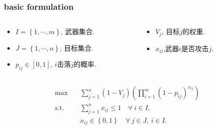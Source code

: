 \documentclass[CJK,10pt]{beamer}
\begin{document}
\begin{frame}
    \frametitle{basic formulation}
    \begin{columns}
        \begin{column}{.70\linewidth}
            \footnotesize
            \begin{itemize}
                \item $I = \left\{1,\cdots,m\right\} $, 武器集合.
                \item $J = \left\{1,\cdots,n\right\} $, 目标集合.
                \item $p_{ij}\in [0,1]$, $i$击落$j$的概率.
            \end{itemize}
        \end{column}
    \hspace{-1cm}
        \begin{column}{.35\linewidth}
            \footnotesize
            \begin{itemize}
                \item $V_j$, 目标$j$的权重.
                \item $x_{ij}$,武器$i$是否攻击$j$.
            \end{itemize}
        \end{column}
    \end{columns}
    
    \begin{align*} \tag{S0}
        \max\quad & \sum_{j=1}^n (1 - V_j) \left( \prod_{i=1}^m (1 -  p_{ij})^{x_{ij}} \right) \\ 
        \mathrm{s. t.}\quad &\sum_{j=1}^n x_{ij} \leq 1\quad \forall ~i \in I,\\
        & x_{ij} \in \left\{ 0,1 \right\} \quad \forall~ j\in J , ~ i \in I.
    \end{align*}
\end{frame}
\end{document}
